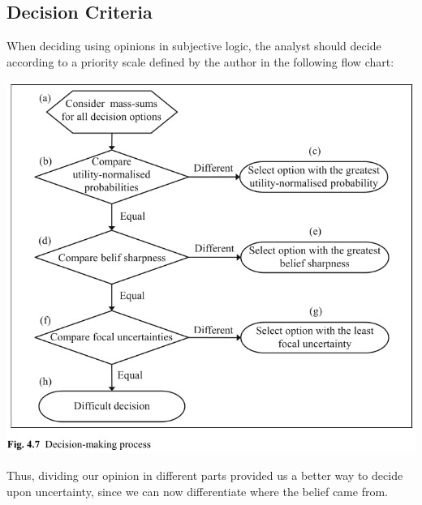 \subsection{Decision Criteria}

When deciding using opinions in subjective logic, the analyst should decide according to a
priority scale defined by the author in the following flow chart:

\includegraphics[width=\linewidth]{images/fig.4.7.png}

Thus, dividing our opinion in different parts provided us a better way to decide upon uncertainty, since we can now differentiate where the belief came from.